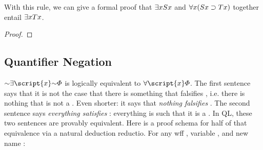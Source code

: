 

With this rule, we can give a formal proof that $\exists x Sx$ and $\forall x(Sx \supset Tx)$ together entail $\qt{\exists}{x} Tx$.

\begin{proof}
	 \pr{}
	\open
		 
	\close
\end{proof}


\iffalse


\begin{proof}
	\hypo{es}{\qt{\exists}{x} Sx} \prs{}{}
	\hypo{ast}{\qt{\forall}{x}(Sx \eif Tx)}\prs{want $\qt{\exists}{x} Tx$}{} 
	\open
		\hypo{s}{Sa}\ass{for $\exists${}E}{}
		\have{st}{Sa \eif Ta}\Ae{ast}
		\have{t}{Ta} \ce{s,st}
		\have{et1}{\qt{\exists}{x} Tx}\Ei{t}
	\close
	\have{et2}{\qt{\exists}{x} Tx}\Ee{es,s-et1}
\end{proof}

\fi 

\subsection{Quantifier Negation}

$\enot\qt{\exists}{\script{x}}\enot\metaA{}$ is logically equivalent to $\qt{\forall}{\script{x}}\metaA{}$. {\color{black} The first sentence says that it is not the case that there is something that falsifies \metaA{}, i.e. there is nothing that is not a \metaA{}. Even shorter:} it says that \emph{nothing falsifies} \metaA{}. The second sentence says \emph{everything satisfies} \metaA{}: everything is such that it is a \metaA{}. In QL, these two sentences are provably equivalent. Here is a proof schema for half of that equivalence via a natural deduction reductio. For any wff \metaA{}, variable , and new name :


